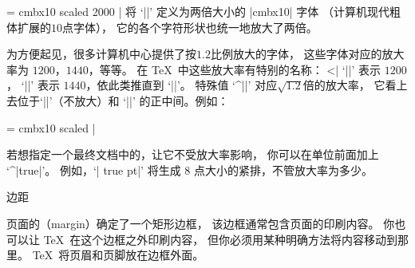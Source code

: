 {{{{{{{{{{%
\csdisplay
\font\largerbold = cmbx10 scaled 2000
|
将 `|\largerbold|' 定义为两倍大小的 |cmbx10| 字体%
（计算机现代粗体扩展的$10$点字体），
它的各个字符形状也统一地放大了两倍。

%
为方便起见，很多计算机中心提供了按$1.2$比例放大的字体，
这些字体对应的放大率为 $1200$，$1440$，等等。
在 \TeX\ 中这些放大率有特别的名称：
^^|\magstep|
`||' 表示 $1200$，
`||' 表示 $1440$，依此类推直到 `||'。
特殊值 `^|\magstephalf|' 对应$\sqrt{1.2}$倍的放大率，
它看上去位于`||'（不放大）和
`||' 的正中间。例如：

\csdisplay
\font\bigbold = cmbx10 scaled \magstephalf
|

若想指定一个最终文档中的，让它不受放大率影响，
你可以在单位前面加上 `^|true|'。
例如，`| true pt|' 将生成 $8$ 点大小的紧排，不管放大率为多少。

\endconcept

\concept 边距

页面的（margin）确定了一个矩形边框，
该边框通常包含页面的印刷内容。
你也可以让 \TeX\ 在这个边框之外印刷内容，
但你必须用某种明确方法将内容移动到那里。
\TeX\ 将页眉和页脚放在边框外面。

}}}}}}}}}}
